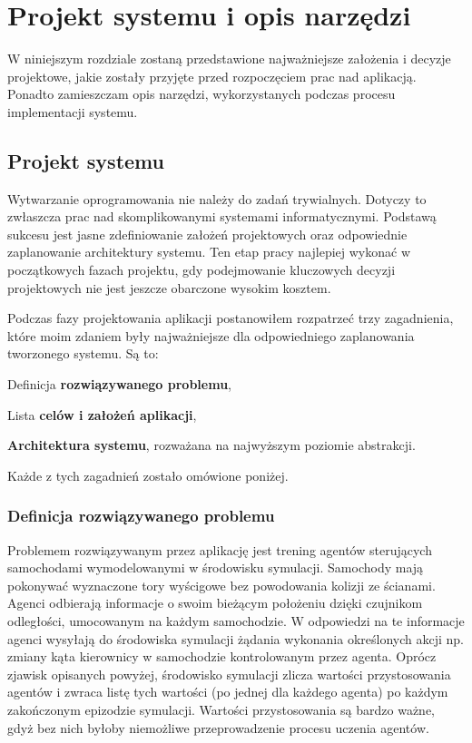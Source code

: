 \chapter{Projekt systemu i opis narzędzi}
\label{DesignSystemChapter}
W niniejszym rozdziale zostaną przedstawione najważniejsze założenia i decyzje projektowe, jakie zostały przyjęte przed rozpoczęciem prac nad aplikacją. Ponadto zamieszczam opis narzędzi, wykorzystanych podczas procesu implementacji systemu.

\section{Projekt systemu}
Wytwarzanie oprogramowania nie należy do zadań trywialnych. Dotyczy to zwłaszcza prac nad skomplikowanymi systemami informatycznymi. Podstawą sukcesu jest jasne zdefiniowanie założeń projektowych oraz odpowiednie zaplanowanie architektury systemu. Ten etap pracy najlepiej wykonać w początkowych fazach projektu, gdy podejmowanie kluczowych decyzji projektowych nie jest jeszcze obarczone wysokim kosztem.

Podczas fazy projektowania aplikacji postanowiłem rozpatrzeć trzy zagadnienia, które moim zdaniem były najważniejsze dla odpowiedniego zaplanowania tworzonego systemu. Są to:
\begin{enumerate*}
\item Definicja \textbf{rozwiązywanego problemu},
\item Lista \textbf{celów i założeń aplikacji},
\item \textbf{Architektura systemu}, rozważana na najwyższym poziomie abstrakcji.
\end{enumerate*}

Każde z tych zagadnień zostało omówione poniżej.

\subsection{Definicja rozwiązywanego problemu}
Problemem rozwiązywanym przez aplikację jest trening agentów sterujących samochodami wymodelowanymi w środowisku symulacji. Samochody mają pokonywać wyznaczone tory wyścigowe bez powodowania kolizji ze ścianami. Agenci odbierają informacje o swoim bieżącym położeniu dzięki czujnikom odległości, umocowanym na każdym samochodzie. W odpowiedzi na te informacje agenci wysyłają do środowiska symulacji żądania wykonania określonych akcji np. zmiany kąta kierownicy w samochodzie kontrolowanym przez agenta. Oprócz zjawisk opisanych powyżej, środowisko symulacji zlicza wartości przystosowania agentów i zwraca listę tych wartości (po jednej dla każdego agenta) po każdym zakończonym epizodzie symulacji. Wartości przystosowania są bardzo ważne, gdyż bez nich byłoby niemożliwe przeprowadzenie procesu uczenia agentów.

